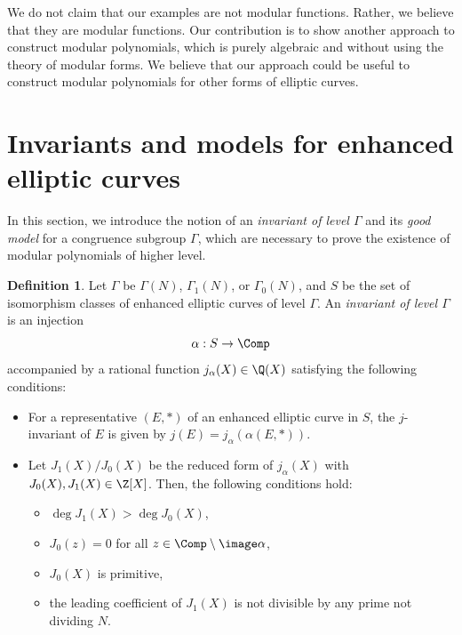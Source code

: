 \documentclass{amsart}
\theoremstyle{definition}
\newtheorem{definition}[theorem]{Definition}
\theoremstyle{remark}
\numberwithin{equation}{section}
\begin{document}
We do not claim that our examples are not modular functions.
Rather, we believe that they are modular functions.
Our contribution is to show another approach to construct modular polynomials,
which is purely algebraic and without using the theory of modular forms.
We believe that our approach could be useful to construct modular polynomials
for other forms of elliptic curves.

\section{Invariants and models for enhanced elliptic curves}\label{sec:invariants_and_models}
In this section, we introduce the notion of
an \emph{invariant of level $\Gamma$} and its \emph{good model} for a congruence subgroup $\Gamma$,
which are necessary to prove the existence of modular polynomials of higher level.
\begin{definition}
    Let $\Gamma$ be $\Gamma(N)$, $\Gamma_1(N)$, or $\Gamma_0(N)$,
    and $S$ be the set of isomorphism classes of
    enhanced elliptic curves of level $\Gamma$.
    An \emph{invariant of level $\Gamma$} is an injection
    \begin{equation*}
        \alpha : S \to \Comp
    \end{equation*}
    accompanied by a rational function $j_\alpha(X) \in \Q(X)$
    satisfying the following conditions:
    \begin{itemize}
        \item For a representative $(E, *)$ of an enhanced elliptic curve in $S$,
            the $j$-invariant of $E$ is given by $j(E) = j_\alpha(\alpha(E, *))$.
        \item Let $J_1(X)/J_0(X)$ be the reduced form of $j_\alpha(X)$
            with $J_0(X), J_1(X) \in \Z[X]$.
            Then, the following conditions hold:
            \begin{itemize}
                \item $\deg J_1(X) > \deg J_0(X)$,
                \item $J_0(z) = 0$ for all $z \in \Comp \setminus \image \alpha$,
                \item $J_0(X)$ is primitive,
                \item the leading coefficient of $J_1(X)$ is not divisible by any prime not dividing $N$.
            \end{itemize}
    \end{itemize}
\end{definition}
\end{document}
